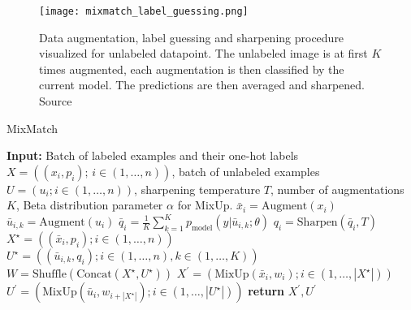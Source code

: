 \begin{figure}[t]
    \centering
    \texttt{[image: mixmatch\_label\_guessing.png]}
    \caption[Mixmatch label guessing]{Data augmentation, label guessing and sharpening procedure visualized for unlabeled datapoint. The unlabeled image is at first $K$ 
    times augmented, each augmentation is then classified by the current model. The predictions are then averaged and sharpened. 
    Source~\cite{mixmatch-2019}}
    \label{fig:mixmatch}
\end{figure}

\begin{algorithm}[H]
 \caption{MixMatch}
 \label{alg:mixmatch}
 \begin{algorithmic}[1]
   \State \textbf{Input:} Batch of labeled examples and their one-hot labels $X = ((x_i, p_i);\,i \in (1, \dots, n))$, batch of unlabeled examples $U = (u_i; i \in (1, \dots, n))$, sharpening temperature $T$, number of augmentations $K$, Beta distribution parameter $\alpha$ for MixUp.
    \State $\bar{x}_i = \text{Augment}(x_i)$ 
     \State $\bar{u}_{i,k} = \text{Augment}(u_i)$ 
    \EndFor
    \State $\bar{q}_i = \frac{1}{K} \sum_{k=1}^{K} p_{\text{model}}(y|\bar{u}_{i,k}; \theta)$ 
    \State $q_i = \text{Sharpen}(\bar{q}_i, T)$ 
   \EndFor
   \State $X^\star = ((\bar{x}_i, p_i); i \in (1, \dots, n))$ 
   \State $U^\star = ((\bar{u}_{i,k}, q_i); i \in (1, \dots, n), k \in (1, \dots, K))$ 
   \State $W = \text{Shuffle}(\text{Concat}(X^\star, U^\star))$ 
   \State $X^\prime = (\text{MixUp}(\bar{x}_i, w_i); i \in (1, \dots, |X^\star|))$ 
   \State $U^\prime = (\text{MixUp}(\bar{u}_{i}, w_{i+|X^\star|}); i \in (1, \dots, |U^\star|))$ 
   \State \textbf{return} $X^\prime, U^\prime$
   
 \end{algorithmic}
\end{algorithm}

